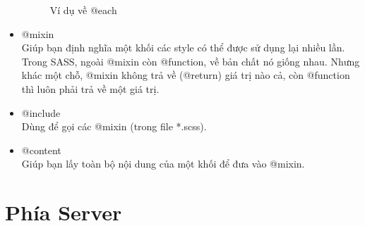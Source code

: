 \begin{itemize}
\begin{figure}[H]
            \caption{Ví dụ về @each}
            \label{fig:sass_each}
        \end{figure}
        \item @mixin\\
        Giúp bạn định nghĩa một khối các style có thể được sử dụng lại nhiều lần. Trong SASS, ngoài @mixin còn @function, về bản chất nó giống nhau. Nhưng khác một chỗ, @mixin không trả về (@return) giá trị nào cả, còn @function thì luôn phải trả về một giá trị.
        \item @include\\
        Dùng để gọi các @mixin (trong file *.scss).
        \item @content\\
        Giúp bạn lấy toàn bộ nội dung của một khối để đưa vào @mixin.
    \end{itemize}
    
\section{Phía Server}
